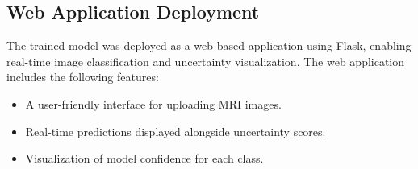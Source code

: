 \documentclass[12pt,onecolumn]{report}
\begin{document}
\subsection{Web Application Deployment}
The trained model was deployed as a web-based application using Flask, enabling real-time image classification and uncertainty visualization. The web application includes the following features:
\begin{itemize}
    \item A user-friendly interface for uploading MRI images.
    \item Real-time predictions displayed alongside uncertainty scores.
    \item Visualization of model confidence for each class.
\end{itemize}


\end{document}
